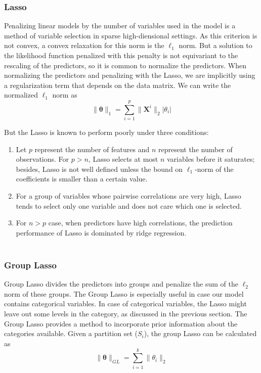 \documentclass[11pt]{article}
\begin{document}
\subsubsection{Lasso}

Penalizing linear models by the number of variables used in the model is a method of variable selection in sparse high-diensional settings. 
As this criterion is not convex, a convex relaxation for this norm is the $\ell_1$ norm. 
But a solution to the likelihood function penalized with this penalty is not equivariant to the rescaling of the predictors, so it is common to normalize the predictors. 
When normalizing the predictors and penalizing with the Lasso, we are implicitly using a regularization term that depends on the data matrix. 
We can write the normalized $\ell_1$ norm as 
$$ \|\mathbf{\theta}\|_1 = \sum \limits_{i=1}^p \|{\mathbf{X}^i}\|_2 |\theta_i| $$ 

But the Lasso is known to perform poorly under three conditions:

\begin{enumerate} 

\item

Let $p$ represent the number of features and $n$ represent the number of observations. For $p>n$, Lasso selects at most $n$ variables before it saturates; besides, Lasso is not well defined unless the bound on $\ell_1$-norm of the coefficients is smaller than a certain value.
\item

For a group of variables whose pairwise correlations are very high, Lasso tends to select only one variable and does not care which one is selected.

\item

 For $n>p$ case, when predictors have high correlations, the prediction performance of Lasso is dominated by ridge regression.\\ \\
 \end{enumerate}


\subsubsection{Group Lasso}

Group Lasso divides the predictors into groups and penalize the sum of the $\ell_2$ norm of these groups.
The Group Lasso is especially useful in case our model contains categorical variables. 
In case of categorical variables, the Lasso might leave out some levels in the category, as discussed in the previous section. 
The Group Lasso provides a method to incorporate prior information about the categories available.
Given a partition set ($S_i$), the group Lasso can be calculated as
$$ \|\mathbf{\theta}\|_{GL} = \sum \limits_{i=1}^k \|\theta_i\|_2 $$
\end{document}
